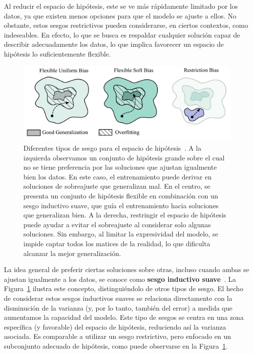 Al reducir el espacio de hipótesis, este se ve más rápidamente limitado por los datos, ya que existen menos opciones para que el modelo se ajuste a ellos. No obstante, estos sesgos restrictivos pueden considerarse, en ciertos contextos, como indeseables. En efecto, lo que se busca es respaldar cualquier solución capaz de describir adecuadamente los datos, lo que implica favorecer un espacio de hipótesis lo suficientemente flexible.

\begin{figure}[h]
    \centering
    \includegraphics[width=0.6\linewidth]{img/types-of-bias.png}
    \caption[Diferentes tipos de sesgo para el espacio de hipótesis~\cite{Wilson2025}.]{Diferentes tipos de sesgo para el espacio de hipótesis~\cite{Wilson2025}. A la izquierda observamos un conjunto de hipótesis grande sobre el cual no se tiene preferencia por las soluciones que ajustan igualmente bien los datos. En este caso, el entrenamiento puede derivar en soluciones de sobreajuste que generalizan mal. En el centro, se presenta un conjunto de hipótesis flexible en combinación con un sesgo inductivo suave, que guía el entrenamiento hacia soluciones que generalizan bien. A la derecha, restringir el espacio de hipótesis puede ayudar a evitar el sobreajuste al considerar solo algunas soluciones. Sin embargo, al limitar la expresividad del modelo, se impide captar todos los matices de la realidad, lo que dificulta alcanzar la mejor generalización.}\label{fig:types-of-bias}
\end{figure}

La idea general de preferir ciertas soluciones sobre otras, incluso cuando ambas se ajustan igualmente a los datos, se conoce como \textbf{sesgo inductivo suave}~\cite{Wilson2025}. La Figura~\ref{fig:types-of-bias} ilustra este concepto, distinguiéndolo de otros tipos de sesgo. El hecho de considerar estos sesgos inductivos suaves se relaciona directamente con la disminución de la varianza (y, por lo tanto, también del error) a medida que aumentamos la capacidad del modelo. Este tipo de sesgos se centra en una zona específica (y favorable) del espacio de hipótesis, reduciendo así la varianza asociada. Es comparable a utilizar un sesgo restrictivo, pero enfocado en un subconjunto adecuado de hipótesis, como puede observarse en la Figura~\ref{fig:types-of-bias}.

